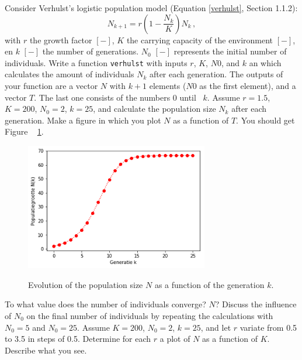 \begin{Exercise} Consider Verhulst's logistic population model (Equation \eqref{verhulst}, Section 1.1.2):
	$$
	N_{k+1} = r\left(1 - \frac{N_k}{K}\right)N_k\,,
	$$
with $r$ the growth factor
 $\left[-\right]$, $K$ the carrying capacity of the environment $\left[-\right]$, en $k$ $\left[-\right]$ the number of generations. $N_0$ $\left[-\right]$ represents the initial number of individuals.
		\Question Write a function \texttt{verhulst} with inputs $r$, $K$, $N0$, and $k$ an which calculates the amount of individuals $N_k$ after each generation. The outputs of your function are a vector $N$ with $k+1$ elements ($N0$ as the first element), and a vector $T$. The last one consists of the numbers $0$ until \ $k$.
		\Question Assume $r = 1.5$, $K = 200$, $N_0 = 2$, $k = 25$, and calculate the population size $N_k$ after each generation.
		\Question Make a figure in which you plot $N$ as a function of $T$. You should get Figure
        ~ \ref{fig:verhulst}.
			
			\begin{figure}[H]
				\centering
				\includegraphics[width=8cm]{verhulst.png}\\
				\caption{Evolution of the population size $N$ as a function of the generation $k$.}
				\label{fig:verhulst}
			\end{figure}
			
			To what value does the number of individuals converge?
            $N$?
		\Question Discuss the influence of $N_0$ on the final number of individuals by repeating the calculations with $N_0 = 5$ and $N_0 = 25$.
		\Question Assume $K = 200$, $N_0 = 2$, $k = 25$, and let $r$ variate from 0.5 to 3.5 in steps of 0.5. Determine for each $r$ a plot of $N$ as a function of $K$. Describe what you see.
		\EndCurrentQuestion
\end{Exercise}

